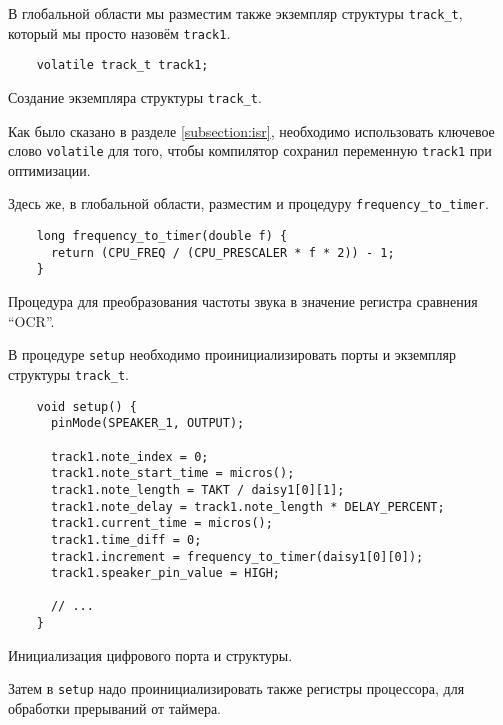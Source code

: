 \documentclass[../sparc.tex]{subfiles}
\begin{document}
В глобальной области мы разместим также экземпляр структуры
\texttt{track_t}, который мы просто назовём \texttt{track1}.

\begin{listing}[H]
  \begin{verbatim}
    volatile track_t track1;
  \end{verbatim}
  \caption{Создание экземпляра структуры \texttt{track_t}.}
  \label{listing:mcu-music-5}
\end{listing}

Как было сказано в разделе \ref{subsection:isr}, необходимо использовать
ключевое слово \texttt{volatile} для того, чтобы компилятор сохранил
переменную \texttt{track1} при оптимизации.

Здесь же, в глобальной области, разместим и процедуру
\texttt{frequency_to_timer}.

\begin{listing}[H]
  \begin{verbatim}
    long frequency_to_timer(double f) {
      return (CPU_FREQ / (CPU_PRESCALER * f * 2)) - 1;
    }
  \end{verbatim}
  \caption{Процедура для преобразования частоты звука в значение регистра
    сравнения ``OCR''.}
  \label{listing:mcu-music-6}
\end{listing}

В процедуре \texttt{setup} необходимо проинициализировать порты и
экземпляр структуры \texttt{track_t}.

\begin{listing}[H]
  \begin{verbatim}
    void setup() {
      pinMode(SPEAKER_1, OUTPUT);

      track1.note_index = 0;
      track1.note_start_time = micros();
      track1.note_length = TAKT / daisy1[0][1];
      track1.note_delay = track1.note_length * DELAY_PERCENT;
      track1.current_time = micros();
      track1.time_diff = 0;
      track1.increment = frequency_to_timer(daisy1[0][0]);
      track1.speaker_pin_value = HIGH;

      // ...
    }
  \end{verbatim}
  \caption{Инициализация цифрового порта и структуры.}
  \label{listing:mcu-music-7}
\end{listing}

Затем в \texttt{setup} надо проинициализировать также регистры
процессора, для обработки прерываний от таймера.
\end{document}
